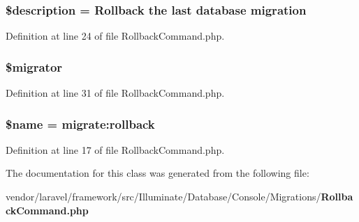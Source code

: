 \subsubsection[{\$description}]{\setlength{\rightskip}{0pt plus 5cm}\$description = \textquotesingle{}Rollback the last database migration\textquotesingle{}\hspace{0.3cm}{\ttfamily [protected]}}\label{class_illuminate_1_1_database_1_1_console_1_1_migrations_1_1_rollback_command_a87b032cba06009e3467abf1c8018d960}


Definition at line 24 of file Rollback\+Command.\+php.

\subsubsection[{\$migrator}]{\setlength{\rightskip}{0pt plus 5cm}\$migrator\hspace{0.3cm}{\ttfamily [protected]}}\label{class_illuminate_1_1_database_1_1_console_1_1_migrations_1_1_rollback_command_aec2ba48e5c793e0c168d4a5aaf932968}


Definition at line 31 of file Rollback\+Command.\+php.

\subsubsection[{\$name}]{\setlength{\rightskip}{0pt plus 5cm}\${\bf name} = \textquotesingle{}migrate\+:rollback\textquotesingle{}\hspace{0.3cm}{\ttfamily [protected]}}\label{class_illuminate_1_1_database_1_1_console_1_1_migrations_1_1_rollback_command_ab2fc40d43824ea3e1ce5d86dee0d763b}


Definition at line 17 of file Rollback\+Command.\+php.



The documentation for this class was generated from the following file\+:\begin{DoxyCompactItemize}
\item 
vendor/laravel/framework/src/\+Illuminate/\+Database/\+Console/\+Migrations/{\bf Rollback\+Command.\+php}\end{DoxyCompactItemize}

